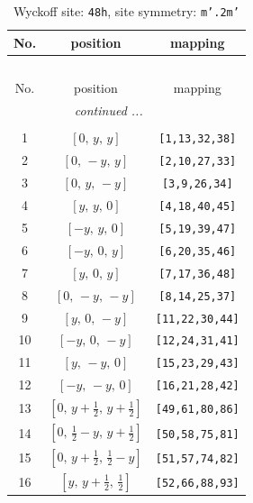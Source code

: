 \documentclass[fleqn,8pt]{jsarticle}
\begin{document}
\begin{longtable}{ccc}
\caption{Wyckoff site: {\tt 48h}, site symmetry: {\tt m'.2m'}}
 \\
 \hline \hline
No. & position & mapping \\ \hline \endfirsthead

\multicolumn{2}{l}{\tablename\ \thetable{}} \\
 \hline \hline
No. & position & mapping \\ \hline \endhead

 \hline \hline
\multicolumn{2}{r}{\footnotesize\it continued ...} \\ \endfoot

 \hline \hline
\multicolumn{2}{r}{} \\ \endlastfoot

1 & $\left[ 0,\, y,\, y \right]$ & {\tt [1,13,32,38]} \\ \hline
2 & $\left[ 0,\, - y,\, y \right]$ & {\tt [2,10,27,33]} \\ \hline
3 & $\left[ 0,\, y,\, - y \right]$ & {\tt [3,9,26,34]} \\ \hline
4 & $\left[ y,\, y,\, 0 \right]$ & {\tt [4,18,40,45]} \\ \hline
5 & $\left[ - y,\, y,\, 0 \right]$ & {\tt [5,19,39,47]} \\ \hline
6 & $\left[ - y,\, 0,\, y \right]$ & {\tt [6,20,35,46]} \\ \hline
7 & $\left[ y,\, 0,\, y \right]$ & {\tt [7,17,36,48]} \\ \hline
8 & $\left[ 0,\, - y,\, - y \right]$ & {\tt [8,14,25,37]} \\ \hline
9 & $\left[ y,\, 0,\, - y \right]$ & {\tt [11,22,30,44]} \\ \hline
10 & $\left[ - y,\, 0,\, - y \right]$ & {\tt [12,24,31,41]} \\ \hline
11 & $\left[ y,\, - y,\, 0 \right]$ & {\tt [15,23,29,43]} \\ \hline
12 & $\left[ - y,\, - y,\, 0 \right]$ & {\tt [16,21,28,42]} \\ \hline
13 & $\left[ 0,\, y + \frac{1}{2},\, y + \frac{1}{2} \right]$ & {\tt [49,61,80,86]} \\ \hline
14 & $\left[ 0,\, \frac{1}{2} - y,\, y + \frac{1}{2} \right]$ & {\tt [50,58,75,81]} \\ \hline
15 & $\left[ 0,\, y + \frac{1}{2},\, \frac{1}{2} - y \right]$ & {\tt [51,57,74,82]} \\ \hline
16 & $\left[ y,\, y + \frac{1}{2},\, \frac{1}{2} \right]$ & {\tt [52,66,88,93]} \\ \hline

\end{longtable}
\end{document}
